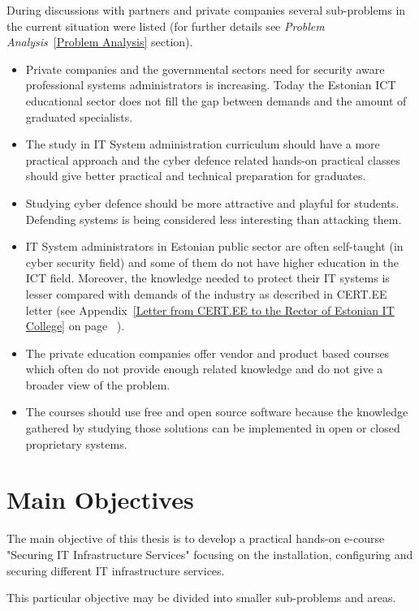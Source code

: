 During discussions with partners and private companies several sub-problems in the current situation were listed (for further details see \emph{Problem Analysis}~\ref{Problem Analysis} section).
\begin{itemize}
\item Private companies and the governmental sectors need for security aware professional systems administrators  is increasing. Today the Estonian \gls{ICT} educational sector does not fill the gap between demands and the amount of graduated specialists.
\item The study in IT System administration curriculum should have a more practical approach and the cyber defence related hands-on practical classes should give better practical and technical preparation for graduates.
\item Studying cyber defence should be more attractive and playful for students. Defending systems is being considered less interesting than attacking them.
\item IT System administrators in Estonian public sector are often self-taught (in cyber security field) and some of them do not have higher education in the \gls{ICT} field. Moreover, the knowledge needed to protect their IT systems is lesser compared with demands of the industry as described in CERT.EE letter (see Appendix~\ref{Letter from CERT.EE to the Rector of Estonian IT College} on page ~\pageref{Letter from CERT.EE to the Rector of Estonian IT College}).
\item The private education companies offer vendor and product based courses which often do not provide enough related knowledge and do not give a broader view of the problem.
\item The courses should use free and open source software because the knowledge gathered by studying those solutions can be implemented in open or closed proprietary systems.
\end{itemize}

\section{Main Objectives}

The main objective of this thesis is to develop a practical hands-on e-course "Securing IT Infrastructure Services" focusing on the installation, configuring and securing different IT infrastructure services.

This particular objective may be divided into smaller sub-problems and areas.


